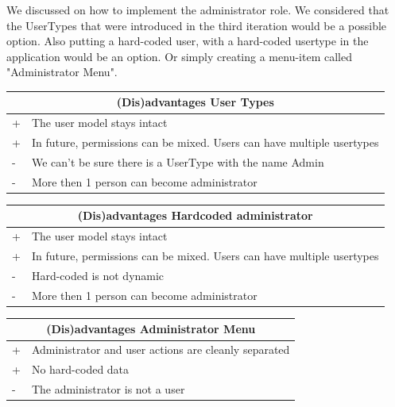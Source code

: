 			We discussed on how to implement the administrator role. We considered that the UserTypes that were introduced in the third iteration would be a possible option. Also putting a hard-coded user, with a hard-coded usertype in the application would be an option. Or simply creating a menu-item called "Administrator Menu".\\
			\begin{tabular}{|l|l|}
				\hline
				\multicolumn{2}{|c|}{(Dis)advantages User Types} \\
				\hline
				+ & The user model stays intact\\
				+ & In future, permissions can be mixed. Users can have multiple usertypes\\
				\hline
				- & We can't be sure there is a UserType with the name Admin\\
				- & More then 1 person can become administrator\\
				\hline
			\end{tabular}
			
			\begin{tabular}{|l|l|}
				\hline
				\multicolumn{2}{|c|}{(Dis)advantages Hardcoded administrator} \\
				\hline
				+ & The user model stays intact\\
				+ & In future, permissions can be mixed. Users can have multiple usertypes\\
				\hline
				- & Hard-coded is not dynamic\\
				- & More then 1 person can become administrator\\
				\hline
			\end{tabular}
			
			\begin{tabular}{|l|l|}
				\hline
				\multicolumn{2}{|c|}{(Dis)advantages Administrator Menu} \\
				\hline
				+ & Administrator and user actions are cleanly separated\\
				+ & No hard-coded data\\
				\hline
				- & The administrator is not a user\\
				\hline
			\end{tabular}
			
